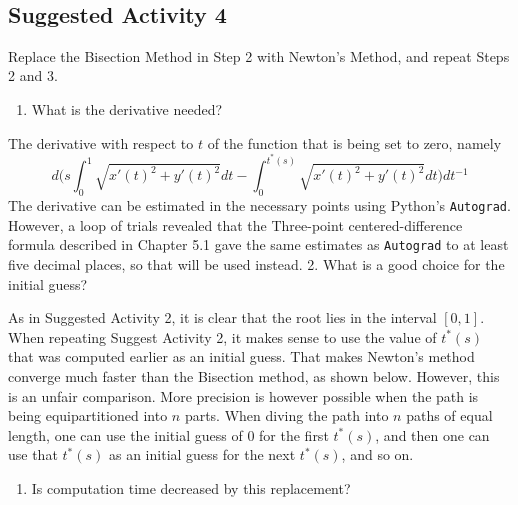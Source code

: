 \documentclass[11pt]{article}
\providecommand{\tightlist}{%
      \setlength{\itemsep}{0pt}\setlength{\parskip}{0pt}}
\begin{document}
    \begin{center}
    \end{center}
    { \hspace*{\fill} \\}
    
    \subsection{Suggested Activity 4}\label{suggested-activity-4}

Replace the Bisection Method in Step 2 with Newton's Method, and repeat
Steps 2 and 3.

\begin{enumerate}
\def\labelenumi{\arabic{enumi}.}
\tightlist
\item
  What is the derivative needed? 
\end{enumerate}

The derivative with respect to \(t\) of the function that is being set
to zero, namely
\[ d \bigg( s \int_{0}^{1} \sqrt{x'(t)^2+y'(t)^2}dt - \int_{0}^{t^*(s)} \sqrt{x'(t)^2+y'(t)^2}dt \bigg) dt^{-1} \]
The derivative can be estimated in the necessary points using Python's
\texttt{Autograd}. However, a loop of trials revealed that the
Three-point centered-difference formula described in Chapter 5.1 gave
the same estimates as \texttt{Autograd} to at least five decimal places,
so that will be used instead. 2. What is a good choice for the initial
guess?

As in Suggested Activity 2, it is clear that the root lies in the
interval \([0,1]\). When repeating Suggest Activity 2, it makes sense to
use the value of \(t^*(s)\) that was computed earlier as an initial
guess. That makes Newton's method converge much faster than the
Bisection method, as shown below. However, this is an unfair comparison.
More precision is however possible when the path is being
equipartitioned into \(n\) parts. When diving the path into \(n\) paths
of equal length, one can use the initial guess of \(0\) for the first
\(t^*(s)\), and then one can use that \(t^*(s)\) as an initial guess for
the next \(t^*(s)\), and so on.

\begin{enumerate}
\def\labelenumi{\arabic{enumi}.}
\setcounter{enumi}{2}
\tightlist
\item
  Is computation time decreased by this replacement? 
\end{enumerate}
\end{document}
